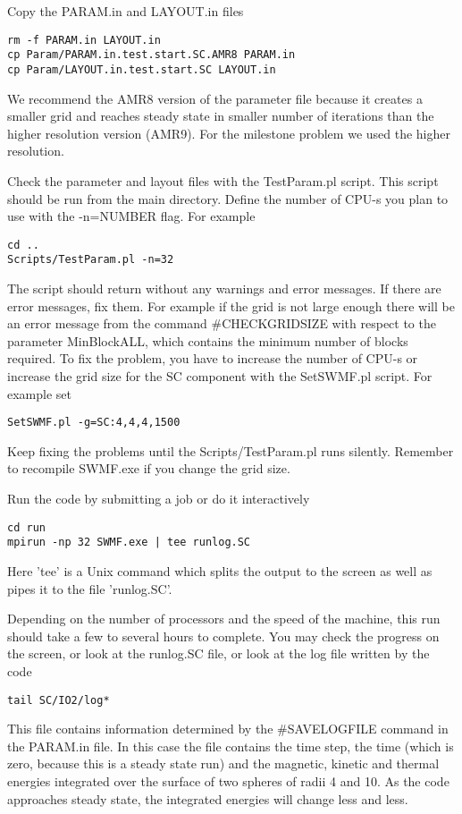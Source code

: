 Copy the PARAM.in and LAYOUT.in files
\begin{verbatim}
rm -f PARAM.in LAYOUT.in
cp Param/PARAM.in.test.start.SC.AMR8 PARAM.in
cp Param/LAYOUT.in.test.start.SC LAYOUT.in
\end{verbatim}
We recommend the AMR8 version of the parameter file because it creates
a smaller grid and reaches steady state in smaller number of iterations
than the higher resolution version (AMR9). For the milestone problem
we used the higher resolution.

Check the parameter and layout files with the TestParam.pl script. 
This script should be run from the main directory.
Define the number of CPU-s you plan to use with the -n=NUMBER flag.
For example
\begin{verbatim}
cd ..
Scripts/TestParam.pl -n=32
\end{verbatim}
The script should return without any warnings and error messages.
If there are error messages, fix them. 
For example if the grid is not large enough there will be an 
error message from the command \#CHECKGRIDSIZE with respect
to the parameter  MinBlockALL, which contains the minimum number
of blocks required. To fix the problem, you have to increase the number 
of CPU-s or increase the grid size for the SC component with the 
SetSWMF.pl script. For example set
\begin{verbatim}
SetSWMF.pl -g=SC:4,4,4,1500
\end{verbatim}
Keep fixing the problems until the Scripts/TestParam.pl runs silently.
Remember to recompile SWMF.exe if you change the grid size.

Run the code by submitting a job or do it interactively
\begin{verbatim}
cd run
mpirun -np 32 SWMF.exe | tee runlog.SC
\end{verbatim}
Here 'tee' is a Unix command which splits the output to the screen as
well as pipes it to the file 'runlog.SC'. 

Depending on the number of processors and the speed of the machine,
this run should take a few to several hours to complete.
You may check the progress on the screen, or look at the 
runlog.SC file, or look at the log file written by the code
\begin{verbatim}
tail SC/IO2/log*
\end{verbatim}
This file contains information determined by the \#SAVELOGFILE command
in the PARAM.in file. In this case the file contains the time step, the
time (which is zero, because this is a steady state run) and the
magnetic, kinetic and thermal energies integrated over the surface of 
two spheres of radii 4 and 10. As the code approaches steady state,
the integrated energies will change less and less. 

